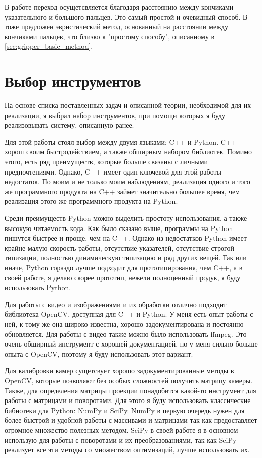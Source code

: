 \documentclass[12pt, a4paper]{article}
\begin{document}
В работе \cite{literally-me} переход осущетсвляется благодаря расстоянию между
кончиками указательного и большого пальцев. Это самый простой и очевидный
способ. В~\cite{gesture_control} тоже предложен эвристический метод, основанный
на расстоянии между кончиками пальцев, что близко к "простому способу",
описанному в \ref{sec:gripper_basic_method}.
\section{Выбор инструментов}
На основе списка поставленных задач и описанной теории, необходимой для их
реализации, я выбрал набор инструментов, при помощи которых я буду
реализовывать систему, описанную ранее.

Для этой работы стоял выбор между двумя языками: C++ и Python. 
C++ хорош своим быстродействием, а также обширным набором библиотек. Помимо
этого, есть ряд преимуществ, которые больше связаны с личными предпочтениями.
Однако, C++ имеет один ключевой для этой работы недостаток. По моим и не только
моим наблюдениям, реализация одного и того же программного продукта на C++
займет значительно большее время, чем реализация этого же программного продукта
на Python.

Среди преимуществ Python можно выделить простоту использования, а также высокую
читаемость кода. Как было сказано выше, программы на Python пишутся быстрее и
проще, чем на C++. Однако из недостатков Python имеет крайне малую скорость
работы, отсутствие указателей, отсутствие строгой типизации, полностью
динамическую типизацию и ряд других вещей. Так или иначе, Python гораздо лучше
подходит для прототипирования, чем C++, а в своей работе, я делаю скорее
прототип, нежели полноценный продук, я буду использовать Python.

Для работы с видео и изображениями и их обработки отлично подходит библиотека
OpenCV, доступная для C++ и Python. У меня есть опыт работы с ней, к тому же
она широко известна, хорошо задокументирована и постоянно обновляется.
Для работы с видео также можно было использовать ffmpeg\cite{ffmpeg}.
Это очень обширный инструмент с хорошей документацией, но у меня сильно больше
опыта с OpenCV, поэтому я буду использовать этот вариант.

Для калибровки камер сущетсвует хорошо задокументированные методы в
OpenCV\cite{opencv_calibration_tutorial, opencv_charuco_pose}, которые
позволяют без особых сложностей получить матрицу камеры. Также, для определения
матрицы проекции понадобится какой-то инструмент для работы с матрицами и
поворотами. Для этого я буду использовать классические бибиотеки для Python:
NumPy и SciPy. NumPy в первую очередь нужен для более быстрой и удобной работы
с массивами и матрицами так как предоставляет огромное множество полезных
методом. SciPy в своей работе я в основном использую для работы с поворотами и
их преобразованиями, так как SciPy реализует все эти методы со множеством
оптимизаций, лучше использовать их.
\end{document}
